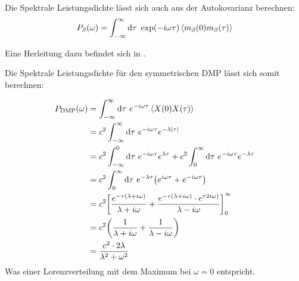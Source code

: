 \documentclass[main.tex]{subfiles}
\begin{document}
Die Spektrale Leistungsdichte lässt sich auch aus der Autokovarianz berechnen:
\begin{align}
	P_\beta(\omega) = \int_{-\infty}^{\infty} \mathrm{d} \tau \ \exp(-i \omega
	\tau) \expval{m_\beta(0) m_\beta(\tau)}
\end{align}

Eine Herleitung dazu befindet sich in \cite{schlegel-master}.

Die Spektrale Leistungsdichte für den symmetrischen DMP lässt sich somit berechnen:


\begin{align}
	P_\text{DMP}(\omega) &= \int_{-\infty}^{\infty} \dif \tau \ e^{-i \omega \tau} \expval{X(0)X(\tau)}\\
	&= c^2 \int_{-\infty}^{\infty} \dif \tau \ e^{-i \omega \tau}e^{-\lambda \abs{\tau}}\\
	&= c^2 \int_{-\infty}^{0} \dif \tau \ e^{-i \omega \tau}e^{\lambda \tau} + c^2 \int_{0}^{\infty} \dif \tau \ e^{-i \omega \tau}e^{-\lambda \tau}\\
	&= c^2 \int_{0}^{\infty} \dif \tau \ e^{-\lambda \tau} \qty(e^{i \omega \tau} + e^{-i \omega \tau})\\
	&= c^2 \qty[\frac{e^{-\tau(\lambda + i\omega)}}{\lambda + i\omega} + \frac{e^{-\tau(\lambda + i\omega)}\cdot e^{\tau 2 i \omega)}}{\lambda - i\omega}]_{0}^{\infty}\\
	&= c^2\qty(\frac{1}{\lambda + i\omega} + \frac{1}{\lambda - i\omega})\\
	&= \frac{c^2 \cdot 2\lambda}{\lambda^2 + \omega^2}
\end{align}
Was einer Lorenzverteilung mit dem Maximum bei \(\omega=0\) entspricht.

\end{document}
